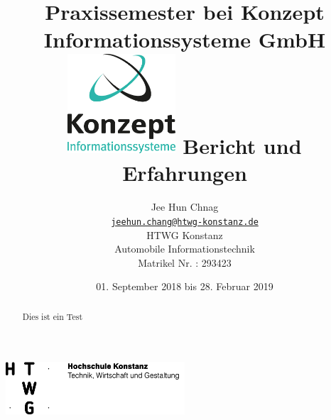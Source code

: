 \documentclass[xcolor=dvipsnames,11pt,paper=a4paper]{report}
\title{
	\Huge\textbf{Praxissemester bei Konzept Informationssysteme GmbH}\\\vspace{20pt}
	\includegraphics[width=0.3\textwidth]{graphics/konzept_logo.jpg} \break
	\huge{Bericht und Erfahrungen}
}
\author{
	\begin{tabular}{l l}
	Jee Hun Chnag \\
	&\href{mailto:jeehun.chang@htwg-konstanz.de}{\texttt{jeehun.chang@htwg-konstanz.de}}\\
	&HTWG Konstanz\\
	&Automobile Informationstechnik\\
	&Matrikel Nr. : 293423	
	\end{tabular}
}
\date{01. September 2018 bis 28. Februar 2019}
\begin{document}

\begin{titlepage}
\begin{center}
\includegraphics[width=0.5\textwidth]{graphics/htwg_logo.png}
\end{center}
{\let\newpage\relax\maketitle}
\end{titlepage}

\begin{abstract}
Dies ist ein Test
\pagebreak
\end{abstract}
\tableofcontents
\pagebreak

\begingroup
\let\clearpage\relax
\lstlistoflistings
\listoffigures
\listoftables
\endgroup
\pagebreak

%



%


%


%

%

%


\end{document}
